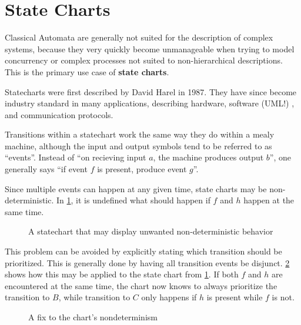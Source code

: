 \documentclass{report}
\newcommand{\tbf}{\textbf}
\newcommand*{\newpar}{\par\vspace{\baselineskip}\noindent} %
\begin{document}
\section{State Charts}
Classical Automata are generally not suited for the description of complex systems, because they very quickly become unmanageable when trying to model concurrency or complex processes not suited to non-hierarchical descriptions. This is the primary use case of \tbf{state charts}.
\newpar
Statecharts were first described by David Harel in 1987. They have since become industry standard in many applications, describing hardware, software (UML!) , and communication protocols.
\newpar
Transitions within a statechart work the same way they do within a mealy machine, although the input and output symbols tend to be referred to as ``events''. Instead of ``on recieving input $a$, the machine produces output $b$'', one generally says ``if event $f$ is present, produce event $g$''.
\newpar
Since multiple events can happen at any given time, state charts may be non-deterministic. In \ref{fig:nsc}, it is undefined what should happen if $f$ and $h$ happen at the same time.
\begin{figure}[h!]
\centering
{}
\caption{A statechart that may display unwanted non-deterministic behavior}
\label{fig:nsc}
\end{figure}
\newpar
This problem can be avoided by explicitly stating which transition should be prioritized. This is generally done by having all transition events be disjunct. \ref{fig:dsc} shows how this may be applied to the state chart from \ref{fig:nsc}. If both $f$ and $h$ are encountered at the same time, the chart now knows to always prioritize the transition to $B$, while transition to $C$ only happens if $h$ is present while $f$ is not.
\begin{figure}[h!]
\centering
{}
\label{fig:dsc}
\caption{A fix to the chart's nondeterminism}
\end{figure}
\end{document}
